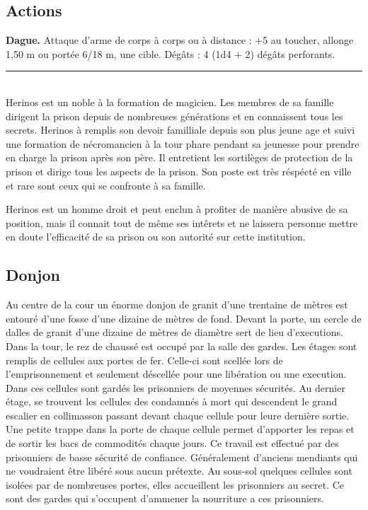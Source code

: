 \begin{figure*}[tb!]
{\begin{minipage}[c]{.45\linewidth}
    \subsection*{Actions}
    {\bfseries Dague.} Attaque d'arme de corps à corps ou à distance : +5 au toucher, allonge 1,50 m ou portée 6/18 m,
         une cible. Dégâts : 4 (1d4 + 2) dégâts perforants.
   \noindent\rule{\textwidth}{1pt} \\
Herinos est un noble à la formation de magicien. Les membres de sa famille
dirigent la prison depuis de nombreuses générations et en connaissent tous les 
secrets. Herinos à remplis son devoir familliale depuis son plus jeune age et
suivi une formation de nécromancien à la tour phare pendant sa jeunesse pour 
prendre en charge la prison après son père. Il entretient les sortilèges de 
protection de la prison et dirige tous les aspects de la prison. Son poste est 
très réspécté en ville et rare sont ceux qui se confronte à sa famille. 

Herinos est un homme droit et peut enclun à profiter de manière abusive de
sa position, mais il connait tout de même ses intêrets et ne laissera personne
mettre en doute l'efficacité de sa prison ou son autorité sur cette institution.
 \end{minipage}
}%
\end{figure*}

\subsection{Donjon}

Au centre de la cour un énorme donjon de granit d'une trentaine de
mètres est entouré d'une fosse
d'une dizaine de mètres de fond. Devant la porte, un 
cercle de dalles de granit d'une dizaine de mètres de diamètre sert de lieu 
d'executions. Dans la tour,
le rez de chaussé est occupé par la salle des gardes. Les étages sont 
remplis de cellules aux portes de fer. Celle-ci sont scellée lors de 
l'emprisonnement et seulement déscellée pour une libération ou une 
execution. Dans ces cellules sont gardés les prisonniers de moyennes 
sécurités. Au dernier étage, se trouvent les cellules des 
condamnés à mort qui descendent le grand escalier en collimasson passant
devant chaque cellule pour leure dernière sortie. Une petite trappe dans 
la porte de chaque cellule permet d'apporter 
les repas et de sortir les bacs de commodités chaque jours. Ce travail est effectué par 
des prisonniers de basse sécurité de confiance. Généralement d'anciens 
mendiants qui ne voudraient être libéré sous aucun prétexte. Au sous-sol quelques cellules sont 
isolées par de nombreuses portes, elles accueillent les prisonniers 
au secret. Ce sont des gardes qui s'occupent d'ammener la nourriture a ces 
prisonniers.

